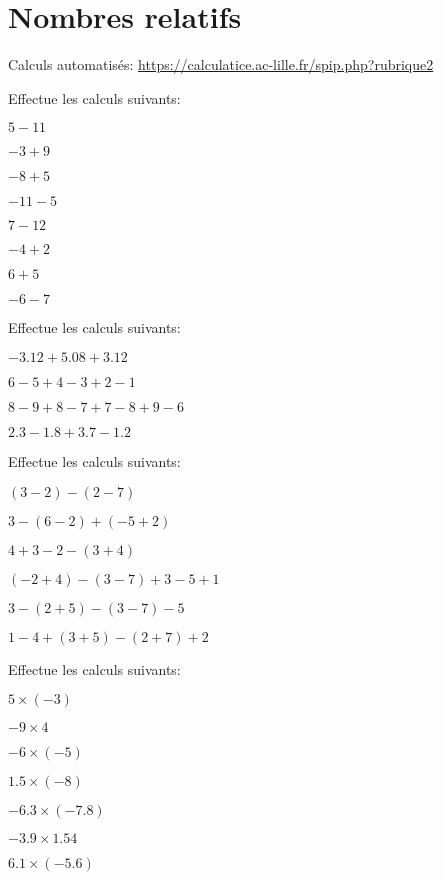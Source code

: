\section{Nombres relatifs}

Calculs automatisés: \url{https://calculatice.ac-lille.fr/spip.php?rubrique2}

\begin{exercicefr}
	Effectue les calculs suivants:
	\begin{exerciceenum}
		\item $5 - 11$
		\item $-3+9$
		\item $-8+5$
		\item $- 11 - 5$
		\item $7 - 12$
		\item $-4+2$
		\item $6+5$
		\item $- 6 - 7$
	\end{exerciceenum}
\end{exercicefr}

\begin{exercicefr}
	Effectue les calculs suivants:
	\begin{exerciceenum}
		\item $- 3.12 + 5.08 + 3.12$
		\item $6-5+4-3+2-1$
		\item $8-9+8-7+7-8+9-6$
		\item $2.3 - 1.8 + 3.7 - 1.2$
	\end{exerciceenum}
\end{exercicefr}

\begin{exercicefr}
	Effectue les calculs suivants:
	\begin{exerciceenum}
		\item $(3-2)-(2-7)$
		\item $3-(6-2)+(-5+2)$
		\item $4+3-2-(3+4)$
		\item $(-2+4)-(3-7)+3-5+1$
		\item $3 - (2 + 5) - (3 - 7) - 5$
		\item $1 - 4 + (3 + 5) - (2 + 7) + 2$
	\end{exerciceenum}
\end{exercicefr}

\begin{exercicefr}
	Effectue les calculs suivants:
	\begin{exerciceenum}
		\item $5 \times (-3)$
		\item $-9 \times 4$
		\item $-6 \times (-5)$
		\item $1.5 \times (-8)$
		\item $-6.3 \times (-7.8)$
		\item $- 3.9 \times 1.54$
		\item $6.1 \times (-5.6)$
	\end{exerciceenum}
\end{exercicefr}



